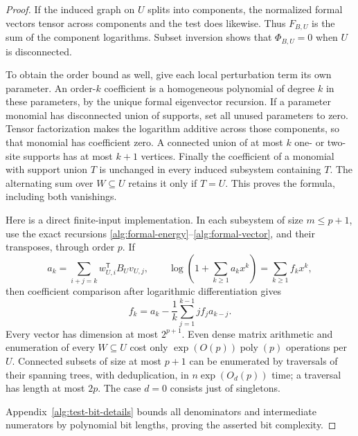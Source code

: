 \documentclass[reqno]{amsart}
\theoremstyle{definition}
\theoremstyle{remark}
\begin{document}
\begin{proof}
If the induced graph on \(U\) splits into components, the
normalized formal vectors tensor across components and the
test does likewise.  Thus \(F_{B,U}\) is the sum of the
component logarithms.  Subset inversion shows that
\(\Phi_{B,U}=0\) when \(U\) is disconnected.

To obtain the order bound as well, give each local perturbation
term its own parameter.  An order-\(k\) coefficient is a
homogeneous polynomial of degree \(k\) in these parameters,
by the unique formal eigenvector recursion.  If a parameter
monomial has disconnected union of supports, set all unused
parameters to zero.  Tensor factorization makes the logarithm
additive across those components, so that monomial has
coefficient zero.  A connected union of at most \(k\) one- or
two-site supports has at most \(k+1\) vertices.
Finally the coefficient of a monomial with support union \(T\)
is unchanged in every induced subsystem containing \(T\).
The alternating sum over \(W\subseteq U\) retains it only if
\(T=U\).  This proves the formula, including both vanishings.

Here is a direct finite-input implementation.  In each subsystem
of size \(m\le p+1\), use the exact recursions
\eqref{alg:formal-energy}--\eqref{alg:formal-vector}, and their
transposes, through order \(p\).
If
\[
 a_k=\sum_{i+j=k}w_{U,i}^{\mathsf T}B_Uv_{U,j},
 \qquad \log\left(1+\sum_{k\ge1}a_kx^k\right)
                  =\sum_{k\ge1}f_kx^k,
\]
then coefficient comparison after logarithmic differentiation gives
\begin{equation}\label{alg:formal-test-log}
 f_k=a_k-\frac1k\sum_{j=1}^{k-1}j f_j a_{k-j}.
\end{equation}
Every vector has dimension at most \(2^{p+1}\).
Even dense matrix arithmetic and enumeration of every
\(W\subseteq U\) cost only \(\exp(O(p))\operatorname{poly}(p)\)
operations per \(U\).  Connected subsets of size at most \(p+1\)
can be enumerated by traversals of their spanning trees, with
deduplication, in \(n\exp(O_d(p))\) time; a traversal has length
at most \(2p\).  The case \(d=0\) consists just of singletons.

Appendix~\ref{alg:test-bit-details} bounds all denominators and
intermediate numerators by polynomial bit lengths, proving the
asserted bit complexity.
\end{proof}
\end{document}
